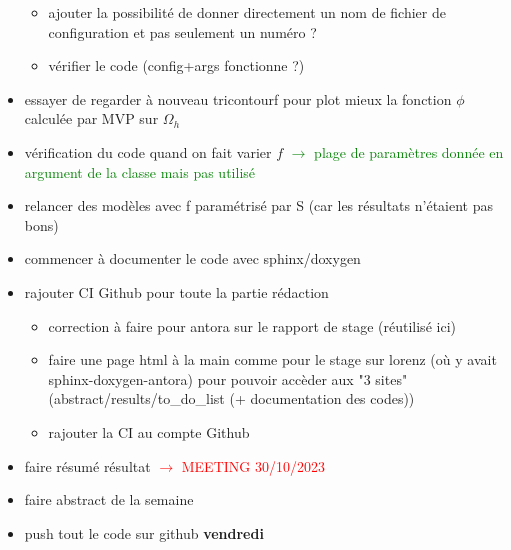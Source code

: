 \begin{itemize}[label=$\square$]
\begin{itemize}[label=\LARGE $\circ$]
		\item ajouter la possibilité de donner directement un nom de fichier de configuration et pas seulement un numéro ?
		\item vérifier le code (config+args fonctionne ?)
	\end{itemize}
	\item essayer de regarder à nouveau tricontourf pour plot mieux la fonction $\phi$ calculée par MVP sur $\Omega_h$
	\item[\done] vérification du code quand on fait varier $f$ \textcolor{Green}{$\rightarrow$ plage de paramètres donnée en argument de la classe mais pas utilisé}
	\item relancer des modèles avec f paramétrisé par S (car les résultats n'étaient pas bons)
	\item commencer à documenter le code avec sphinx/doxygen
	\item rajouter CI Github pour toute la partie rédaction
	\begin{itemize}[label=\LARGE $\circ$]
		\item correction à faire pour antora sur le rapport de stage (réutilisé ici)
		\item faire une page html à la main comme pour le stage sur lorenz (où y avait sphinx-doxygen-antora) pour pouvoir accèder aux "3 sites" (abstract/results/to\_do\_list (+ documentation des codes))
		\item rajouter la CI au compte Github
	\end{itemize}
	\item[\done] faire résumé résultat \textcolor{red}{$\rightarrow$ MEETING 30/10/2023} 
	\item faire abstract de la semaine 
	\item push tout le code sur github \textbf{vendredi}
\end{itemize}